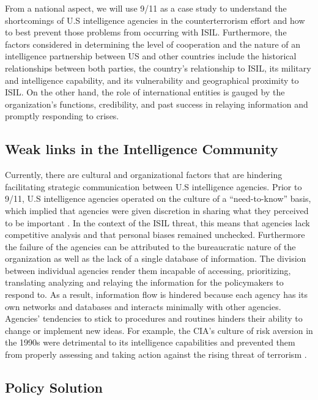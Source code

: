 \documentclass{report}
\begin{document}
From a national aspect, we will use 9/11 as a case study to understand the shortcomings of U.S intelligence agencies in the counterterrorism effort and how to best prevent those problems from occurring with ISIL. Furthermore, the factors considered in determining the level of cooperation and the nature of an intelligence partnership between US and other countries include the historical relationships between both parties, the country’s relationship to ISIL, its military and intelligence capability, and its vulnerability and geographical proximity to ISIL. On the other hand, the role of international entities is gauged by the organization’s functions, credibility, and past success in relaying information and promptly responding to crises. 

\subsection{Weak links in the Intelligence Community}

Currently, there are cultural and organizational factors that are hindering facilitating strategic communication between U.S intelligence agencies.  Prior to 9/11, U.S intelligence agencies operated on the culture of a \enquote{need-to-know} basis, which implied that agencies were given discretion in sharing what they perceived to be important \cite{McConnell2008}. In the context of the ISIL threat, this means that agencies lack competitive analysis and that personal biases remained unchecked. Furthermore the failure of the agencies can be attributed to the bureaucratic nature of the organization as well as the lack of a single database of information. The division between individual agencies render them incapable of accessing,  prioritizing, translating analyzing and relaying the information for the policymakers to respond to. As a result, information flow is hindered because each agency has its own networks and databases and interacts minimally with other agencies.  Agencies’ tendencies to stick to procedures and routines hinders their ability to change or implement new ideas. For example, the CIA’s culture of risk aversion in the 1990s were detrimental to its intelligence capabilities and prevented them from properly assessing and taking action against the rising threat of terrorism \cite{Zegart2005}.

\subsection{Policy Solution}
\end{document}
